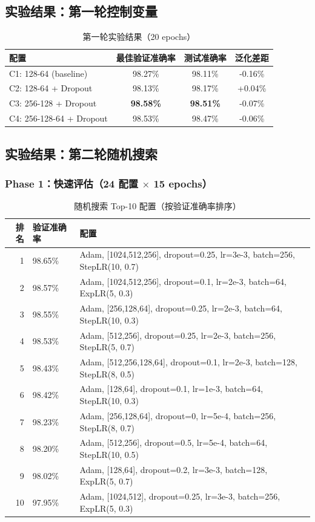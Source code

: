 \documentclass[12pt,a4paper]{ctexart}
\begin{document}
\subsection{实验结果：第一轮控制变量}

\begin{table}[H]
\centering
\caption{第一轮实验结果（20 epochs）}
\begin{tabular}{@{}lccc@{}}
\toprule
\textbf{配置} & \textbf{最佳验证准确率} & \textbf{测试准确率} & \textbf{泛化差距} \\
\midrule
C1: 128-64 (baseline)    & 98.27\% & 98.11\% & -0.16\% \\
C2: 128-64 + Dropout     & 98.13\% & 98.17\% & +0.04\% \\
C3: 256-128 + Dropout    & \textbf{98.58\%} & \textbf{98.51\%} & -0.07\% \\
C4: 256-128-64 + Dropout & 98.53\% & 98.47\% & -0.06\% \\
\bottomrule
\end{tabular}
\end{table}

\subsection{实验结果：第二轮随机搜索}

\subsubsection{Phase 1：快速评估（24 配置 $\times$ 15 epochs）}

\begin{table}[H]
\centering
\caption{随机搜索 Top-10 配置（按验证准确率排序）}
\begin{tabular}{@{}rll@{}}
\toprule
\textbf{排名} & \textbf{验证准确率} & \textbf{配置} \\
\midrule
1  & 98.65\% & Adam, [1024,512,256], dropout=0.25, lr=3e-3, batch=256, StepLR(10, 0.7) \\
2  & 98.57\% & Adam, [1024,512,256], dropout=0.1, lr=2e-3, batch=64, ExpLR(5, 0.3) \\
3  & 98.55\% & Adam, [256,128,64], dropout=0.25, lr=2e-3, batch=64, StepLR(10, 0.3) \\
4  & 98.53\% & Adam, [512,256], dropout=0.25, lr=2e-3, batch=256, StepLR(5, 0.7) \\
5  & 98.43\% & Adam, [512,256,128,64], dropout=0.1, lr=2e-3, batch=128, StepLR(8, 0.5) \\
6  & 98.42\% & Adam, [128,64], dropout=0.1, lr=1e-3, batch=64, StepLR(10, 0.3) \\
7  & 98.23\% & Adam, [256,128,64], dropout=0, lr=5e-4, batch=256, StepLR(8, 0.7) \\
8  & 98.20\% & Adam, [512,256], dropout=0.5, lr=5e-4, batch=64, StepLR(10, 0.5) \\
9  & 98.02\% & Adam, [128,64], dropout=0.2, lr=3e-3, batch=128, ExpLR(5, 0.7) \\
10 & 97.95\% & Adam, [1024,512], dropout=0.25, lr=3e-3, batch=256, ExpLR(5, 0.3) \\
\bottomrule
\end{tabular}
\end{table}
\end{document}
